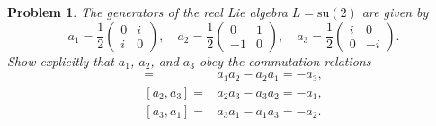 \documentclass[UTF8,10pt,a4paper]{article}
\theoremstyle{Problem}
\newtheorem{prob}{Problem}
\theoremstyle{Solution}
\begin{document}
\begin{prob}
    The generators of the real Lie algebra $L=\text{su}(2)$ are given by
    \[
        a_1=\frac{1}{2}\left(\begin{matrix}
            0&i\\
            i&0
        \end{matrix}\right),\quad a_2=\frac{1}{2}\left(\begin{matrix}
            0&1\\
            -1&0
        \end{matrix}\right),\quad a_3=\frac{1}{2}\left(\begin{matrix}
            i&0\\
            0&-i
        \end{matrix}\right).
    \]
    Show explicitly that $a_1$, $a_2$, and $a_3$ obey the commutation relations
    \begin{align*}
        [a_1,a_2]=&a_1a_2-a_2a_1=-a_3,\\
        [a_2,a_3]=&a_2a_3-a_3a_2=-a_1,\\
        [a_3,a_1]=&a_3a_1-a_1a_3=-a_2.
    \end{align*}
\end{prob}
\end{document}
